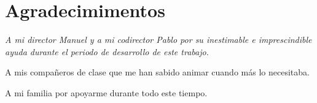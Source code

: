 \pagestyle{plain}
\chapter*{Agradecimimentos}


\begin{center}
{\em
A mi director Manuel y a mi codirector Pablo por su inestimable e imprescindible ayuda durante el periodo de desarrollo de este trabajo.

\bigskip

A mis compañeros de clase que me han sabido animar cuando más lo necesitaba.

\bigskip

A mi familia por apoyarme durante todo este tiempo.

}
\end{center}


